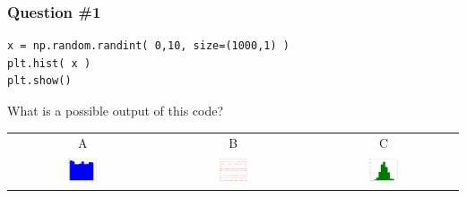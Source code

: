 \documentclass[11pt]{beamer}
\begin{document}
\begin{frame}[fragile]
  \frametitle{Question \#1}
  \Enlarge

  \begin{Verbatim}
x = np.random.randint( 0,10, size=(1000,1) )
plt.hist( x )
plt.show()
  \end{Verbatim}

  What is a possible output of this code?

  \begin{center}
  \begin{tabular}{ccc}
    A & B & C \\
    \includegraphics[width=0.25\textwidth]{./img/figure_1.png}
    &
    \includegraphics[width=0.25\textwidth]{./img/figure_2.png}
    &
    \includegraphics[width=0.25\textwidth]{./img/figure_3.png}
  \end{tabular}
  \end{center}
\end{frame}
\end{document}
